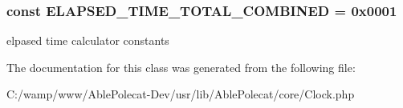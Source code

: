 \subsubsection[{E\+L\+A\+P\+S\+E\+D\+\_\+\+T\+I\+M\+E\+\_\+\+T\+O\+T\+A\+L\+\_\+\+C\+O\+M\+B\+I\+N\+E\+D}]{\setlength{\rightskip}{0pt plus 5cm}const E\+L\+A\+P\+S\+E\+D\+\_\+\+T\+I\+M\+E\+\_\+\+T\+O\+T\+A\+L\+\_\+\+C\+O\+M\+B\+I\+N\+E\+D = 0x0001}\label{class_able_polecat___clock_a88569a59df69a0777e5206c28facbf63}
elpased time calculator constants 

The documentation for this class was generated from the following file\+:\begin{DoxyCompactItemize}
\item 
C\+:/wamp/www/\+Able\+Polecat-\/\+Dev/usr/lib/\+Able\+Polecat/core/Clock.\+php\end{DoxyCompactItemize}
